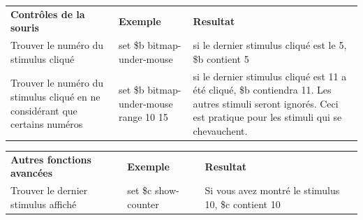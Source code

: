 \documentclass[
]{book}
\begin{document}
\begin{longtable}[]{@{}lll@{}}
\toprule
\endhead
\begin{minipage}[t]{0.34\columnwidth}\raggedright
\textbf{Contrôles de la souris}\strut
\end{minipage} & \begin{minipage}[t]{0.18\columnwidth}\raggedright
\textbf{Exemple}\strut
\end{minipage} & \begin{minipage}[t]{0.39\columnwidth}\raggedright
\textbf{Resultat}\strut
\end{minipage}\tabularnewline
\begin{minipage}[t]{0.34\columnwidth}\raggedright
Trouver le numéro du stimulus cliqué\strut
\end{minipage} & \begin{minipage}[t]{0.18\columnwidth}\raggedright
set \$b bitmap-under-mouse\strut
\end{minipage} & \begin{minipage}[t]{0.39\columnwidth}\raggedright
si le dernier stimulus cliqué est le 5, \$b contient 5\strut
\end{minipage}\tabularnewline
\begin{minipage}[t]{0.34\columnwidth}\raggedright
Trouver le numéro du stimulus cliqué en ne considérant que certains numéros\strut
\end{minipage} & \begin{minipage}[t]{0.18\columnwidth}\raggedright
set \$b bitmap-under-mouse range 10 15\strut
\end{minipage} & \begin{minipage}[t]{0.39\columnwidth}\raggedright
si le dernier stimulus cliqué est 11 a été cliqué, \$b contiendra 11. Les autres stimuli seront ignorés. Ceci est pratique pour les stimuli qui se chevauchent.\strut
\end{minipage}\tabularnewline
\bottomrule
\end{longtable}

\begin{longtable}[]{@{}lll@{}}
\toprule
\endhead
\begin{minipage}[t]{0.30\columnwidth}\raggedright
\textbf{Autres fonctions avancées}\strut
\end{minipage} & \begin{minipage}[t]{0.19\columnwidth}\raggedright
\textbf{Exemple}\strut
\end{minipage} & \begin{minipage}[t]{0.42\columnwidth}\raggedright
\textbf{Resultat}\strut
\end{minipage}\tabularnewline
\begin{minipage}[t]{0.30\columnwidth}\raggedright
Trouver le dernier stimulus affiché\strut
\end{minipage} & \begin{minipage}[t]{0.19\columnwidth}\raggedright
set \$c show-counter\strut
\end{minipage} & \begin{minipage}[t]{0.42\columnwidth}\raggedright
Si vous avez montré le stimulus 10, \$c contient 10\strut
\end{minipage}\tabularnewline
\bottomrule
\end{longtable}
\end{document}
